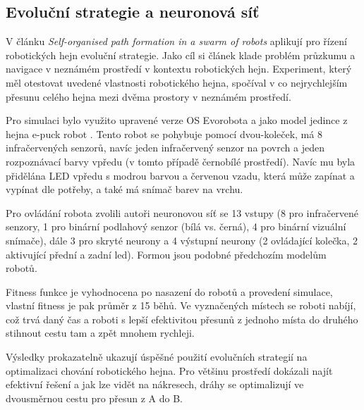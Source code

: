 \subsection{Evoluční strategie a neuronová síť}
V článku \textit{Self-organised path formation in a swarm of robots} \citep{sperati2011self} aplikují pro řízení robotických hejn evoluční strategie. Jako cíl si článek klade problém průzkumu a navigace v neznámém prostředí v kontextu robotických hejn. Experiment, který měl otestovat uvedené vlastnosti robotického hejna, spočíval v co nejrychlejším přesunu celého hejna mezi dvěma prostory v neznámém prostředí. 
\par 
Pro simulaci bylo využito upravené verze OS Evorobota a jako model jedince z hejna e-puck robot \citep{mondada2009puck}. Tento robot se pohybuje pomocí dvou-koleček, má 8 infračervených senzorů, navíc jeden infračervený senzor na povrch a jeden rozpoznávací barvy vpředu (v tomto případě černobílé prostředí). Navíc mu byla přidělána LED vpředu s modrou barvou a červenou vzadu, která může zapínat a vypínat dle potřeby, a také má snímač barev na vrchu. 
\par
Pro ovládání robota zvolili autoři neuronovou síť se 13 vstupy (8 pro infračervené senzory, 1 pro binární podlahový senzor (bílá vs. černá), 4 pro binární vizuální snímače), dále 3 pro skryté neurony a 4 výstupní neurony (2 ovládající kolečka, 2 aktivující přední a zadní led). Formou jsou podobné předchozím modelům robotů. 
\par
Fitness funkce je vyhodnocena po nasazení do robotů a provedení simulace, vlastní fitness je pak průměr z 15 běhů. Ve vyznačených místech se roboti nabíjí, což trvá daný čas a roboti s lepší efektivitou přesunů z jednoho místa do druhého stihnout cestu tam a zpět mnohem rychleji.
\par 
Výsledky prokazatelně ukazují úspěšné použití evolučních strategií na optimalizaci chování robotického hejna. Pro většinu prostředí dokázali najít efektivní řešení a jak lze vidět na nákresech, dráhy se optimalizují ve dvousměrnou cestu pro přesun z A do B.



